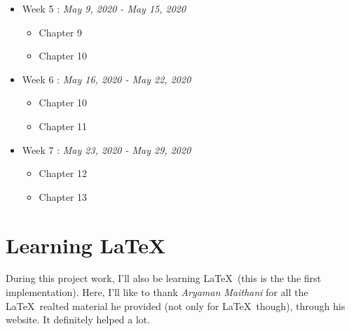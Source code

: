 \documentclass[11pt]{article}
\begin{document}
\begin{itemize}
	\item Week 5 : \textit{May 9, 2020 - May 15, 2020}
	\begin{itemize}
		\itemsep-1mm
		\item Chapter 9
		\item Chapter 10
	\end{itemize}
\end{itemize}

\begin{itemize}
	\item Week 6 : \textit{May 16, 2020 - May 22, 2020}
	\begin{itemize}
		\itemsep-1mm
		\item Chapter 10
		\item Chapter 11
	\end{itemize}
\end{itemize}

\begin{itemize}
	\item Week 7 : \textit{May 23, 2020 - May 29, 2020}
	\begin{itemize}
		\itemsep-1mm
		\item Chapter 12
		\item Chapter 13
	\end{itemize}
\end{itemize}

\section*{Learning \LaTeX\ }
During this project work, I'll also be learning \LaTeX\ (this is the the first implementation). Here, I'll like to thank \textit{Aryaman Maithani} for all the \LaTeX\ realted material he provided (not only for \LaTeX\ though), through his website. It definitely helped a lot.
\end{document}
